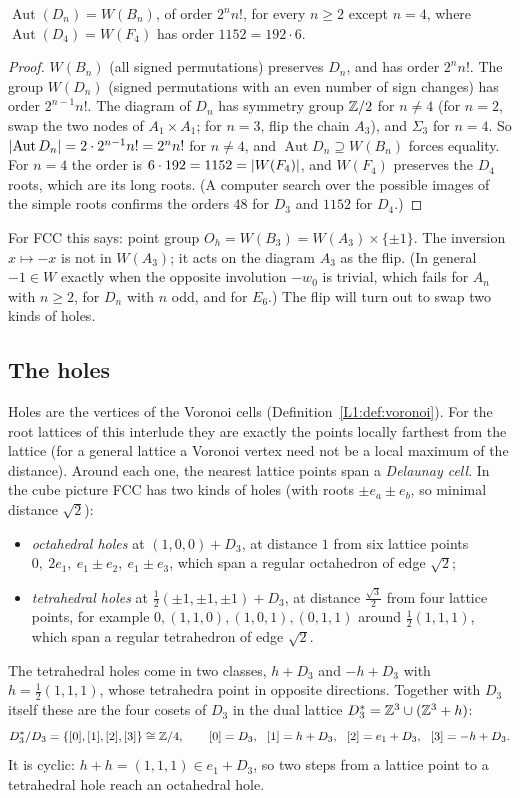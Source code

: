 \begin{proposition}\label{DYN:prop:autD}
$\operatorname{Aut}(D_n)=W(B_n)$, of order $2^nn!$, for every $n\ge2$ except $n=4$, where
$\operatorname{Aut}(D_4)=W(F_4)$ has order $1152=192\cdot6$.
\end{proposition}

\begin{proof}
$W(B_n)$ (all signed permutations) preserves $D_n$, and has order $2^nn!$. The group
$W(D_n)$ (signed permutations with an even number of sign changes) has order $2^{n-1}n!$. The diagram
of $D_n$ has symmetry group $\mathbb{Z}/2$ for $n\ne4$ (for $n=2$, swap the two nodes of $A_1\times A_1$; for
$n=3$, flip the chain $A_3$), and $\Sigma_3$ for $n=4$. So $\left\lvert \operatorname{Aut}D_n \right\rvert=2\cdot2^{n-1}n!=2^nn!$
for $n\ne4$, and $\operatorname{Aut}D_n\supseteq W(B_n)$ forces equality. For $n=4$ the order is
$6\cdot192=1152=\left\lvert W(F_4) \right\rvert$, and $W(F_4)$ preserves the $D_4$ roots, which are its long roots. (A computer
search over the possible images of the simple roots confirms the orders $48$ for $D_3$ and $1152$ for $D_4$.)
\end{proof}

For FCC this says: point group $O_h=W(B_3)=W(A_3)\times\{\pm1\}$. The inversion $x\mapsto-x$ is not in
$W(A_3)$; it acts on the diagram $A_3$ as the flip. (In general $-1\in W$ exactly when the opposite
involution $-w_0$ is trivial, which fails for $A_n$ with $n\ge2$, for $D_n$ with $n$ odd, and for
$E_6$.) The flip will turn out to swap two kinds of holes.

\subsection*{The holes}
Holes are the vertices of the Voronoi cells (Definition~\ref{L1:def:voronoi}). For the root lattices of
this interlude they are exactly the points locally farthest from the lattice (for a general lattice a
Voronoi vertex need not be a local maximum of the distance).
Around each one, the nearest lattice points span a \emph{Delaunay cell}. In the cube picture FCC has
two kinds of holes (with roots $\pm e_a\pm e_b$, so minimal distance $\sqrt2$):
\begin{itemize}
\item \emph{octahedral holes} at $(1,0,0)+D_3$, at distance $1$ from six lattice points
  $0,\ 2e_1,\ e_1\pm e_2,\ e_1\pm e_3$, which span a regular octahedron of edge $\sqrt2$;
\item \emph{tetrahedral holes} at $\frac12(\pm1,\pm1,\pm1)+D_3$, at distance $\frac{\sqrt3}2$ from four
  lattice points, for example $0,(1,1,0),(1,0,1),(0,1,1)$ around $\frac12(1,1,1)$, which span a regular
  tetrahedron of edge $\sqrt2$.
\end{itemize}
The tetrahedral holes come in two classes, $h+D_3$ and $-h+D_3$ with $h=\frac12(1,1,1)$, whose
tetrahedra point in opposite directions. Together with $D_3$ itself these are the four cosets of $D_3$ in
the dual lattice $D_3^*=\mathbb{Z}^3\cup(\mathbb{Z}^3+h)$:
\[
  D_3^*/D_3=\{[0],[1],[2],[3]\}\cong\mathbb{Z}/4,\qquad [0]=D_3,\ \ [1]=h+D_3,\ \ [2]=e_1+D_3,\ \ [3]=-h+D_3 .
\]
It is cyclic: $h+h=(1,1,1)\in e_1+D_3$, so two steps from a lattice point to a tetrahedral hole
reach an octahedral hole.

